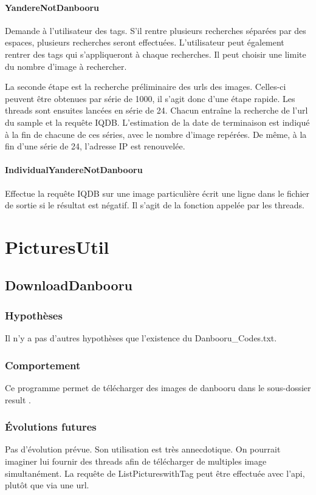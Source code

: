 \documentclass[a4paper,12pt]{article}
\begin{document}
\paragraph{YandereNotDanbooru}
Demande à l'utilisateur des tags. S'il rentre plusieurs recherches séparées par des espaces, plusieurs recherches seront effectuées. L'utilisateur peut également rentrer des tags qui s'appliqueront à chaque recherches. Il peut choisir une limite du nombre d'image à rechercher.

La seconde étape est la recherche préliminaire des urls des images. Celles-ci peuvent être obtenues par série de 1000, il s'agit donc d'une étape rapide.
Les threads sont ensuites lancées en série de 24. Chacun entraîne la recherche de l'url du sample et la requête IQDB. L'estimation de la date de terminaison est indiqué à la fin de chacune de ces séries, avec le nombre d'image repérées. De même, à la fin d'une série de 24, l'adresse IP est renouvelée.
\paragraph{IndividualYandereNotDanbooru}
Effectue la requête IQDB sur une image particulière écrit une ligne dans le fichier de sortie si le résultat est négatif. Il s'agit de la fonction appelée par les threads. 

\section{PicturesUtil}
\subsection{DownloadDanbooru}
\subsubsection{Hypothèses}
Il n'y a pas d'autres hypothèses que l'existence du Danbooru\_Codes.txt.
\subsubsection{Comportement}
Ce programme permet de télécharger des images de danbooru dans le sous-dossier \og result \fg{}.  
\subsubsection{Évolutions futures}
Pas d'évolution prévue. Son utilisation est très annecdotique.
On pourrait imaginer lui fournir des threads afin de télécharger de multiples image simultanément.
La requête de ListPictureswithTag peut être effectuée avec l'api, plutôt que via une url.
\end{document}
